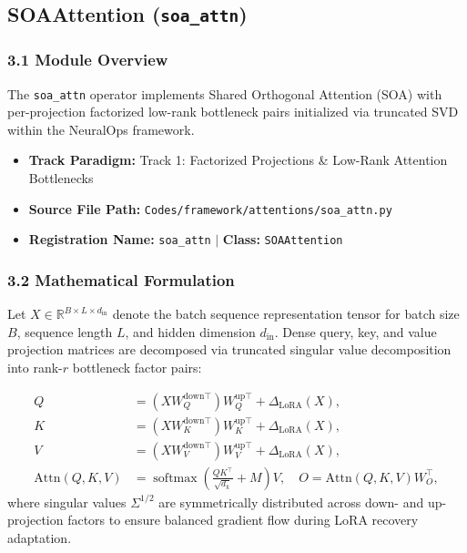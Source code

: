 \subsection{SOAAttention (\texttt{soa\_attn})}
\label{sec:app_module_soa_attn}

\subsubsection*{3.1 Module Overview}
The \texttt{soa\_attn} operator implements Shared Orthogonal Attention (SOA) with per-projection factorized low-rank bottleneck pairs initialized via truncated SVD within the NeuralOps framework.
\begin{itemize}
    \item \textbf{Track Paradigm:} Track 1: Factorized Projections \& Low-Rank Attention Bottlenecks
    \item \textbf{Source File Path:} \texttt{Codes/framework/attentions/soa\_attn.py}
    \item \textbf{Registration Name:} \texttt{soa\_attn} $\mid$ \textbf{Class:} \texttt{SOAAttention}
\end{itemize}

\subsubsection*{3.2 Mathematical Formulation}
Let $X \in \mathbb{R}^{B \times L \times d_{\text{in}}}$ denote the batch sequence representation tensor for batch size $B$, sequence length $L$, and hidden dimension $d_{\text{in}}$. Dense query, key, and value projection matrices are decomposed via truncated singular value decomposition into rank-$r$ bottleneck factor pairs:

\begin{align}
Q &= \left( X W_Q^{\text{down}\top} \right) W_Q^{\text{up}\top} + \Delta_{\text{LoRA}}(X), \\
K &= \left( X W_K^{\text{down}\top} \right) W_K^{\text{up}\top} + \Delta_{\text{LoRA}}(X), \\
V &= \left( X W_V^{\text{down}\top} \right) W_V^{\text{up}\top} + \Delta_{\text{LoRA}}(X), \\
\text{Attn}(Q, K, V) &= \operatorname{softmax}\left(\frac{Q K^\top}{\sqrt{d_k}} + M\right) V, \quad O = \text{Attn}(Q, K, V) W_O^\top,
\end{align}
where singular values $\Sigma^{1/2}$ are symmetrically distributed across down- and up-projection factors to ensure balanced gradient flow during LoRA recovery adaptation.

